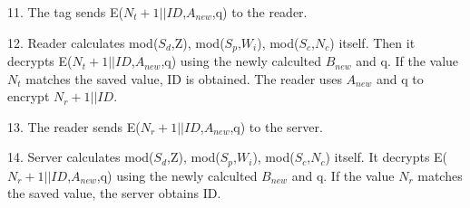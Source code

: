 {    11. The tag sends E($N_t+1||ID$,$A_{new}$,q) to the reader.
    
    12. Reader calculates mod($S_d$,Z), mod($S_p$,$W_i$), mod($S_c$,$N_c$) itself. Then it decrypts E($N_t+1||ID$,$A_{new}$,q) 
    using the newly calculted $B_{new}$ and q. If the value $N_t$ matches the saved value, ID is obtained. The reader uses $A_{new}$ and q to encrypt $N_r+1||ID$. 

    13. The reader sends E($N_r+1||ID$,$A_{new}$,q) to the server.

    14. Server calculates mod($S_d$,Z), mod($S_p$,$W_i$), mod($S_c$,$N_c$) itself. It decrypts E($N_r+1||ID$,$A_{new}$,q) using the newly calculted $B_{new}$ and q. If the value $N_r$ 
    matches the saved value, the server obtains ID.
    
}


